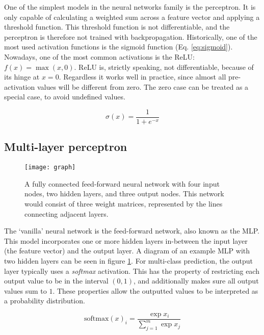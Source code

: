 One of the simplest models in the neural networks family is the perceptron.
It is only capable of calculating a weighted sum across a feature vector and
applying a threshold function. This threshold function is not differentiable,
and the perceptron is therefore not trained with backpropagation.
Historically, one of the most used activation functions is the sigmoid
function (Eq. \ref{eq:sigmoid}). Nowadays, one of the most
common activations is the \ac{ReLU}: \(f(x) = \max(x, 0)\). \ac{ReLU} is,
strictly speaking, not differentiable, because of its hinge at $x = 0$.
Regardless it works well in practice, since almost all pre-activation values
will be different from zero. The zero case can be treated as a special case,
to avoid undefined values.

\begin{equation} \label{eq:sigmoid}
  \sigma(x) = {\frac{1}{1 + e^{-x}}}
\end{equation}

\subsection{Multi-layer perceptron}

\begin{figure}
  \centering
  \texttt{[image: graph]}
  \caption[Illustration of a feed-forward neural network]{
    A fully connected feed-forward neural network with four input nodes, two
    hidden layers, and three output nodes. This network would consist of
    three weight matrices, represented by the lines connecting adjacent
    layers.
  }
  \label{fig:mlp-diagram}
\end{figure}

The `vanilla' neural network is the feed-forward network, also known as the
\ac{MLP}. This model incorporates one or more hidden layers in-between the
input layer (the feature vector) and the output layer. A diagram of an
example \ac{MLP} with two hidden layers can be seen in figure
\ref{fig:mlp-diagram}. For multi-class prediction, the output layer typically
uses a \emph{softmax} activation. This has the property of restricting each
output value to be in the interval $(0,1)$, and additionally makes sure all
output values sum to $1$. These properties allow the outputted values to be
interpreted as a probability distribution.

\begin{equation}\label{eq:softmax}
  \mathrm{softmax}(x)_i = \frac{\exp{x_i}}{\sum_{j=1}^{m}\exp{x_j}}
\end{equation}


